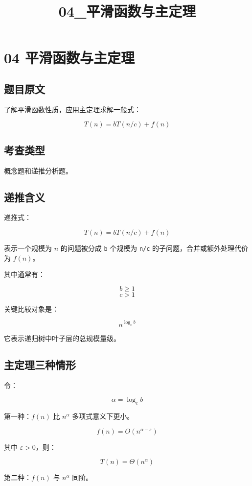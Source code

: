 \documentclass[UTF8,zihao=-4]{ctexart}
\title{04\_平滑函数与主定理}
\author{}
\date{}
\begin{document}
\maketitle

\section*{04 平滑函数与主定理}

\subsection*{题目原文}

了解平滑函数性质，应用主定理求解一般式：

\[T(n) = bT(n/c) + f(n)\]

\subsection*{考查类型}

概念题和递推分析题。

\subsection*{递推含义}

递推式：

\[T(n) = bT(n/c) + f(n)\]

表示一个规模为 $n$ 的问题被分成 \texttt{b} 个规模为 \texttt{n/c} 的子问题，合并或额外处理代价为 $f(n)$。

其中通常有：

\[b \ge  1\]
\[c > 1\]

关键比较对象是：

\[n^{\log_c b}\]

它表示递归树中叶子层的总规模量级。

\subsection*{主定理三种情形}

令：

\[\alpha = \log_c b\]

第一种：$f(n)$ 比 $n^\alpha$ 多项式意义下更小。

\[f(n) = O(n^{\alpha - \varepsilon})\]

其中 $\varepsilon > 0$，则：

\[T(n) = \Theta(n^\alpha)\]

第二种：$f(n)$ 与 $n^\alpha$ 同阶。
\end{document}
